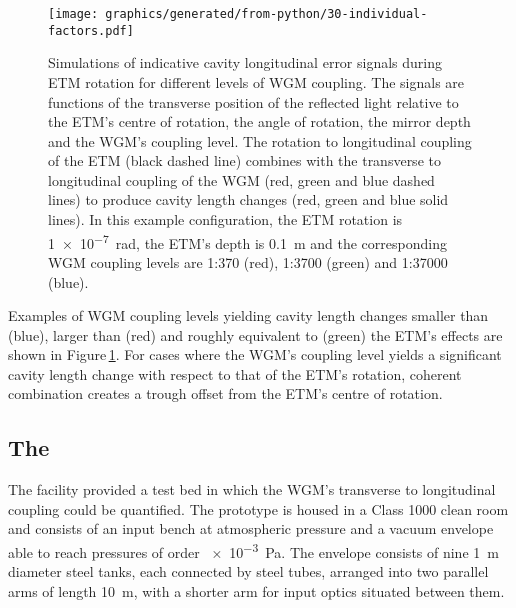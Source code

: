\begin{figure}
  \centering
  \texttt{[image: graphics/generated/from-python/30-individual-factors.pdf]}
  \caption{\label{fig:coupling-contributions}Simulations of indicative cavity longitudinal error signals during \gls{ETM} rotation for different levels of \gls{WGM} coupling. The signals are functions of the transverse position of the reflected light relative to the \gls{ETM}'s centre of rotation, the angle of rotation, the mirror depth and the \gls{WGM}'s coupling level. The rotation to longitudinal coupling of the \gls{ETM} (black dashed line) combines with the transverse to longitudinal coupling of the \gls{WGM} (red, green and blue dashed lines) to produce cavity length changes (red, green and blue solid lines). In this example configuration, the \gls{ETM} rotation is \SI{1e-7}{\radian}, the \gls{ETM}'s depth is \SI{0.1}{\meter} and the corresponding \gls{WGM} coupling levels are 1:370 (red), 1:3700 (green) and 1:37000 (blue).}
\end{figure}

Examples of \gls{WGM} coupling levels yielding cavity length changes smaller than (blue), larger than (red) and roughly equivalent to (green) the \gls{ETM}'s effects are shown in Figure\,\ref{fig:coupling-contributions}. For cases where the \gls{WGM}'s coupling level yields a significant cavity length change with respect to that of the \gls{ETM}'s rotation, coherent combination creates a trough offset from the \gls{ETM}'s centre of rotation.

%
%

\subsection{The \GLASGOWTENM{}}
\label{sec:glasgow10m}

The \GLASGOWTENM{} facility provided a test bed in which the \gls{WGM}'s transverse to longitudinal coupling could be quantified. The prototype is housed in a Class 1000 clean room and consists of an input bench at atmospheric pressure and a vacuum envelope able to reach pressures of order \SI{e-3}{\pascal}. The envelope consists of nine \SI{1}{\meter} diameter steel tanks, each connected by steel tubes, arranged into two parallel arms of length \SI{10}{\meter}, with a shorter arm for input optics situated between them.

